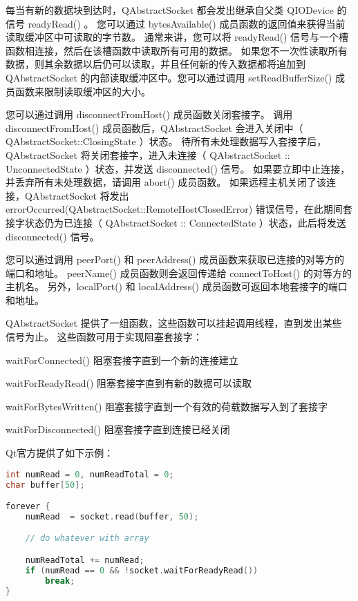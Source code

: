 每当有新的数据块到达时，QAbstractSocket 都会发出继承自父类 QIODevice 的信号 readyRead() 。 您可以通过 bytesAvailable() 成员函数的返回值来获得当前读取缓冲区中可读取的字节数。 通常来讲，您可以将 readyRead() 信号与一个槽函数相连接，然后在该槽函数中读取所有可用的数据。 如果您不一次性读取所有数据，则其余数据以后仍可以读取，并且任何新的传入数据都将追加到 QAbstractSocket 的内部读取缓冲区中。您可以通过调用 setReadBufferSize() 成员函数来限制读取缓冲区的大小。

您可以通过调用 disconnectFromHost() 成员函数关闭套接字。 调用 disconnectFromHost() 成员函数后，QAbstractSocket 会进入关闭中（ QAbstractSocket::ClosingState ）状态。 待所有未处理数据写入套接字后，QAbstractSocket 将关闭套接字，进入未连接（ QAbstractSocket :: UnconnectedState ）状态，并发送 disconnected() 信号。 如果要立即中止连接，并丢弃所有未处理数据，请调用 abort() 成员函数。 如果远程主机关闭了该连接，QAbstractSocket 将发出 errorOccurred(QAbstractSocket::RemoteHostClosedError) 错误信号，在此期间套接字状态仍为已连接（ QAbstractSocket :: ConnectedState ）状态，此后将发送 disconnected() 信号。

您可以通过调用 peerPort() 和 peerAddress() 成员函数来获取已连接的对等方的端口和地址。 peerName() 成员函数则会返回传递给 connectToHost() 的对等方的主机名。 另外，localPort() 和 localAddress() 成员函数可返回本地套接字的端口和地址。

QAbstractSocket 提供了一组函数，这些函数可以挂起调用线程，直到发出某些
信号为止。 这些函数可用于实现阻塞套接字：

\begin{compactitem}[\arr]
\item waitForConnected() 阻塞套接字直到一个新的连接建立
\item waitForReadyRead() 阻塞套接字直到有新的数据可以读取
\item waitForBytesWritten() 阻塞套接字直到一个有效的荷载数据写入到了套接字
\item waitForDisconnected() 阻塞套接字直到连接已经关闭
\end{compactitem}



Qt官方提供了如下示例：

\begin{lstlisting}[language=C++]
int numRead = 0, numReadTotal = 0;
char buffer[50];

forever {
	numRead  = socket.read(buffer, 50);

	// do whatever with array

	numReadTotal += numRead;
	if (numRead == 0 && !socket.waitForReadyRead())
		break;
}

\end{lstlisting}

